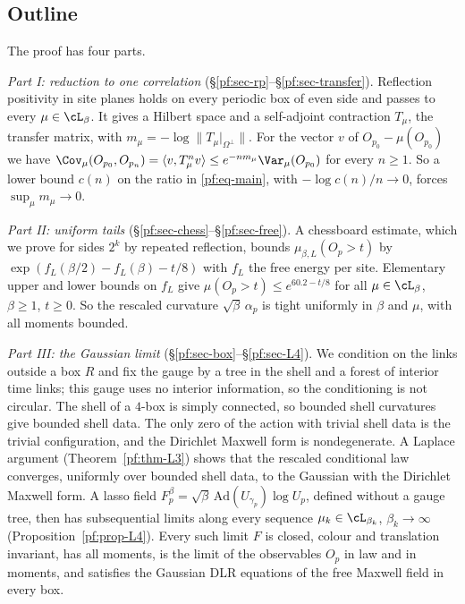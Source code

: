 \subsection{Outline}\label{pf:sec-outline}

The proof has four parts.

\emph{Part I: reduction to one correlation} (\S\ref{pf:sec-rp}--\S\ref{pf:sec-transfer}). Reflection positivity in site planes holds on every periodic box of even side and passes to every $\mu\in\cL_\beta$. It gives a Hilbert space and a self-adjoint contraction $T_\mu$, the transfer matrix, with $m_\mu=-\log\|T_\mu|_{\Omega^\perp}\|$. For the vector $v$ of $O_{p_0}-\mu(O_{p_0})$ we have $\Cov_\mu(O_{p_0},O_{p_n})=\langle v,T_\mu^nv\rangle\le e^{-nm_\mu}\Var_\mu(O_{p_0})$ for every $n\ge1$. So a lower bound $c(n)$ on the ratio in \eqref{pf:eq-main}, with $-\log c(n)/n\to0$, forces $\sup_\mu m_\mu\to0$.

\emph{Part II: uniform tails} (\S\ref{pf:sec-chess}--\S\ref{pf:sec-free}). A chessboard estimate, which we prove for sides $2^k$ by repeated reflection, bounds $\mu_{\beta,L}(O_p>t)$ by $\exp(f_L(\beta/2)-f_L(\beta)-t/8)$ with $f_L$ the free energy per site. Elementary upper and lower bounds on $f_L$ give $\mu(O_p>t)\le e^{60.2-t/8}$ for all $\mu\in\cL_\beta$, $\beta\ge1$, $t\ge0$. So the rescaled curvature $\sqrt\beta\,\alpha_p$ is tight uniformly in $\beta$ and $\mu$, with all moments bounded.

\emph{Part III: the Gaussian limit} (\S\ref{pf:sec-box}--\S\ref{pf:sec-L4}). We condition on the links outside a box $R$ and fix the gauge by a tree in the shell and a forest of interior time links; this gauge uses no interior information, so the conditioning is not circular. The shell of a $4$-box is simply connected, so bounded shell curvatures give bounded shell data. The only zero of the action with trivial shell data is the trivial configuration, and the Dirichlet Maxwell form is nondegenerate. A Laplace argument (Theorem~\ref{pf:thm-L3}) shows that the rescaled conditional law converges, uniformly over bounded shell data, to the Gaussian with the Dirichlet Maxwell form. A lasso field $F^\beta_p=\sqrt\beta\,\mathrm{Ad}(U_{\gamma_p})\log U_p$, defined without a gauge tree, then has subsequential limits along every sequence $\mu_k\in\cL_{\beta_k}$, $\beta_k\to\infty$ (Proposition~\ref{pf:prop-L4}). Every such limit $F$ is closed, colour and translation invariant, has all moments, is the limit of the observables $O_p$ in law and in moments, and satisfies the Gaussian DLR equations of the free Maxwell field in every box.

